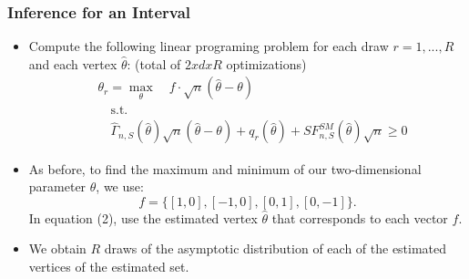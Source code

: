 \documentclass[notes=show]{beamer}
\begin{document}

\begin{frame}
\frametitle{Inference for an Interval}

\begin{itemize}
\item Compute the following linear programing problem for each draw $%
r=1,...,R$ and each vertex $\hat{\theta}$: (total of $2xdxR$ optimizations)  
\begin{equation}
\begin{split}
& \theta _{r}=\max_{\theta }\quad f\cdot \sqrt{n}(\hat{\theta}-\theta ) \\
& \quad \text{s.t.} \\
& \quad \widehat{\Gamma }_{n,S}(\hat{\theta})\sqrt{n}(\hat{\theta}-\theta
)+q_{r}(\hat{\theta})+SF_{n,S}^{SM}(\hat{\theta})\sqrt{n}\geq 0
\end{split}%
\end{equation}

\item As before, to find the maximum and minimum of our
two-dimensional parameter $\theta$, we use:  
\begin{equation*}
f=\{[1,0],[-1,0],[0,1],[0,-1]\}.
\end{equation*}
In equation (2), use the estimated
vertex $\hat{\theta}$ that corresponds to each vector $f$. 

\item We obtain $R$ draws of the asymptotic distribution of each of the
estimated vertices of the estimated set.
\end{itemize}
\end{frame}

\end{document}

